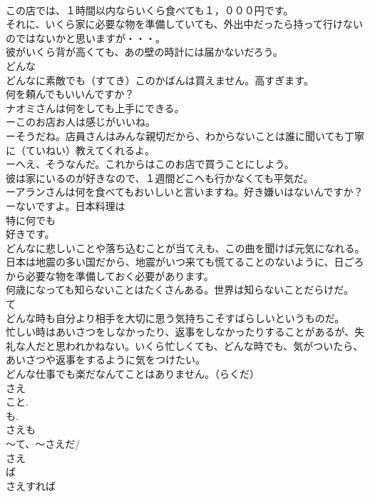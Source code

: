 \documentclass[8pt]{extreport}
\begin{document}
\begin{CJK}{UTF8}{min}
\\	この店では、１時間以内ならいくら食べても１，０００円です。
\\	それに、いくら家に必要な物を準備していても、外出中だったら持って行けないのではないかと思いますが・・・。
\\	彼がいくら背が高くても、あの壁の時計には届かないだろう。
\\	どんな 
\\	どんなに素敵でも（すてき）このかばんは買えません。高すぎます。
\\	何を頼んでもいいんですか？
\\	ナオミさんは何をしても上手にできる。
\\	ーこのお店お人は感じがいいね。
\\	ーそうだね。店員さんはみんな親切だから、わからないことは誰に聞いても丁寧に（ていねい）教えてくれるよ。
\\	ーへえ、そうなんだ。これからはこのお店で買うことにしよう。
\\	彼は家にいるのが好きなので、１週間どこへも行かなくても平気だ。
\\	ーアランさんは何を食べてもおいしいと言いますね。好き嫌いはないんですか？
\\	ーないですよ。日本料理は
\\	特に何でも
\\	好きです。
\\	どんなに悲しいことや落ち込むことが当てえも、この曲を聞けば元気になれる。
\\	日本は地震の多い国だから、地震がいつ来ても慌てることのないように、日ごろから必要な物を準備しておく必要があります。
\\	何歳になっても知らないことはたくさんある。世界は知らないことだらけだ。
\\	て 
\\	どんな時も自分より相手を大切に思う気持ちこそすばらしいというものだ。
\\	忙しい時はあいさつをしなかったり、返事をしなかったりすることがあるが、失礼な人だと思われかねない。いくら忙しくても、どんな時でも、気がついたら、あいさつや返事をするように気をつけたい。
\\	どんな仕事でも楽だなんてことはありません。（らくだ）
\\	さえ
\\	こと.
\\	も. 
\\	さえも
\\	～て、～さえだ/
\\	さえ
\\	ば
\\	さえすれば

\end{CJK}
\end{document}
